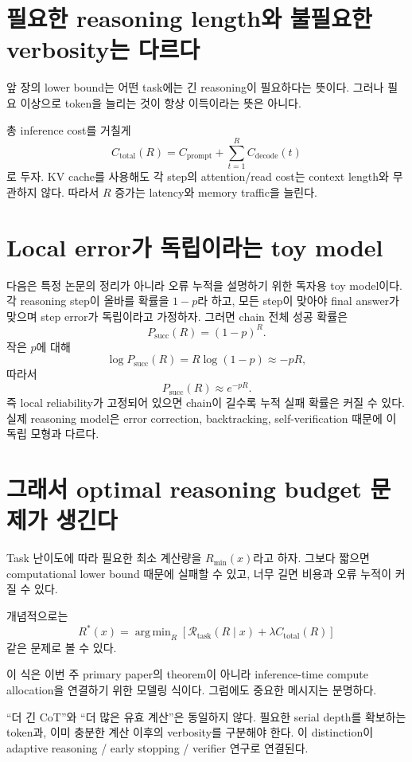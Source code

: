 \documentclass[11pt,a4paper,oneside,openany]{memoir}
\newcommand{\Risk}{\mathcal{R}}
\DeclareMathOperator*{\argmin}{arg\,min}
\theoremstyle{definition}
\begin{document}
\section{필요한 reasoning length와 불필요한 verbosity는 다르다}

앞 장의 lower bound는 어떤 task에는 긴 reasoning이 필요하다는 뜻이다.
그러나 필요 이상으로 token을 늘리는 것이 항상 이득이라는 뜻은 아니다.

총 inference cost를 거칠게
\[
C_{\mathrm{total}}(R)
=
C_{\mathrm{prompt}}
+
\sum_{t=1}^{R}C_{\mathrm{decode}}(t)
\]
로 두자.
KV cache를 사용해도 각 step의 attention/read cost는 context length와 무관하지 않다.
따라서 $R$ 증가는 latency와 memory traffic을 늘린다.

\section{Local error가 독립이라는 toy model}

\begin{suppbox}
다음은 특정 논문의 정리가 아니라 오류 누적을 설명하기 위한 독자용 toy model이다.
각 reasoning step이 올바를 확률을 $1-p$라 하고, 모든 step이 맞아야 final answer가 맞으며 step error가 독립이라고 가정하자.
그러면 chain 전체 성공 확률은
\[
P_{\mathrm{succ}}(R)
=(1-p)^R.
\]
작은 $p$에 대해
\[
\log P_{\mathrm{succ}}(R)
=R\log(1-p)
\approx -pR,
\]
따라서
\[
P_{\mathrm{succ}}(R)
\approx e^{-pR}.
\]
즉 local reliability가 고정되어 있으면 chain이 길수록 누적 실패 확률은 커질 수 있다.
실제 reasoning model은 error correction, backtracking, self-verification 때문에 이 독립 모형과 다르다.
\end{suppbox}

\section{그래서 optimal reasoning budget 문제가 생긴다}

Task 난이도에 따라 필요한 최소 계산량을 $R_{\min}(x)$라고 하자.
그보다 짧으면 computational lower bound 때문에 실패할 수 있고,
너무 길면 비용과 오류 누적이 커질 수 있다.

개념적으로는
\[
R^*(x)
=
\argmin_R
\left[
\Risk_{\mathrm{task}}(R\mid x)
+\lambda C_{\mathrm{total}}(R)
\right]
\]
같은 문제로 볼 수 있다.

이 식은 이번 주 primary paper의 theorem이 아니라 inference-time compute allocation을 연결하기 위한 모델링 식이다.
그럼에도 중요한 메시지는 분명하다.

\begin{keybox}
``더 긴 CoT''와 ``더 많은 유효 계산''은 동일하지 않다.
필요한 serial depth를 확보하는 token과, 이미 충분한 계산 이후의 verbosity를 구분해야 한다.
이 distinction이 adaptive reasoning / early stopping / verifier 연구로 연결된다.
\end{keybox}
\end{document}
